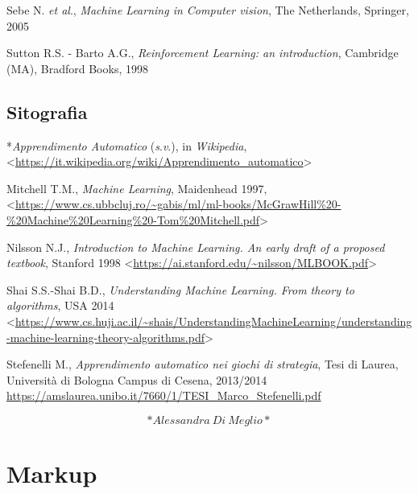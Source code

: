\documentclass[
  b5paper,
  twoside,
  12pt,
  chapterprefix=false,
  bibliography=totocnumbered,
  parskip=false]{scrbook}
\begin{document}
Sebe N. \emph{et al}., \emph{Machine Learning in Computer vision}, The
Netherlands, Springer, 2005

Sutton R.S. - Barto A.G., \emph{Reinforcement Learning: an introduction},
Cambridge (MA), Bradford Books, 1998

\hypertarget{sitografia-20}{%
\section*{Sitografia}\label{sitografia-20}}

*\emph{Apprendimento Automatico} (\emph{s}.\emph{v}.), in \emph{Wikipedia},
\textless{}\href{https://it.wikipedia.org/wiki/Apprendimento_automatico}{{https://it.wikipedia.org/wiki/Apprendimento\_automatico}}\textgreater{}

Mitchell T.M., \emph{Machine Learning}, Maidenhead 1997,
\textless{}\href{https://www.cs.ubbcluj.ro/~gabis/ml/ml-books/McGrawHill\%20-\%20Machine\%20Learning\%20-Tom\%20Mitchell.pdf}{{https://www.cs.ubbcluj.ro/\textasciitilde gabis/ml/ml-books/McGrawHill\%20-\%20Machine\%20Learning\%20-Tom\%20Mitchell.pdf}}\textgreater{}

Nilsson N.J., \emph{Introduction to Machine Learning. An early draft of a
proposed textbook}, Stanford 1998
\textless{}\href{https://ai.stanford.edu/~nilsson/MLBOOK.pdf}{{https://ai.stanford.edu/\textasciitilde nilsson/MLBOOK.pdf}}\textgreater{}

Shai S.S.-Shai B.D., \emph{Understanding Machine Learning. From theory to
algorithms}, USA 2014
\textless{}\href{https://www.cs.huji.ac.il/~shais/UnderstandingMachineLearning/understanding-machine-learning-theory-algorithms.pdf}{{https://www.cs.huji.ac.il/\textasciitilde shais/UnderstandingMachineLearning/understanding-machine-learning-theory-algorithms.pdf}}\textgreater{}

Stefenelli M., \emph{Apprendimento automatico nei giochi di strategia}, Tesi
di Laurea, Università di Bologna Campus di Cesena, 2013/2014
\url{https://amslaurea.unibo.it/7660/1/TESI_Marco_Stefenelli.pdf}

\[*Alessandra~Di~Meglio*\]

\hypertarget{markup}{%
\chapter{Markup}\label{markup}}
\end{document}
